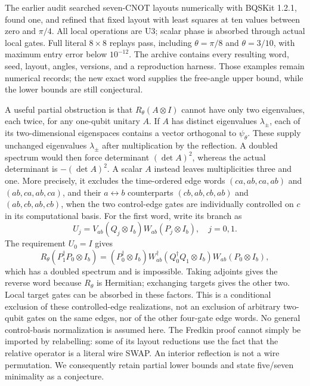 \documentclass[11pt]{article}
\begin{document}
The earlier audit searched seven-CNOT layouts numerically with BQSKit 1.2.1,
found one, and refined that fixed layout with least squares at ten values
between zero and $\pi/4$. All local operations are U3; scalar phase is
absorbed through actual local gates. Full literal $8\times8$ replays pass,
including $\theta=\pi/8$ and $\theta=3/10$, with maximum entry error below
$10^{-12}$. The archive contains every resulting word, seed, layout, angles,
versions, and a reproduction harness. Those examples remain numerical records; the new exact word supplies the
free-angle upper bound, while the lower bounds are still conjectural.

A useful partial obstruction is that $R_\theta(A\otimes I)$ cannot have
only two eigenvalues, each twice, for any one-qubit unitary $A$.
If $A$ has distinct eigenvalues $\lambda_\pm$, each of its two-dimensional
eigenspaces contains a vector orthogonal to $\psi_\theta$. These supply
unchanged eigenvalues $\lambda_\pm$ after multiplication by the reflection.
A doubled spectrum would then force determinant $(\det A)^2$, whereas the
actual determinant is $-(\det A)^2$. A scalar $A$ instead leaves multiplicities
three and one. More precisely, it excludes the time-ordered edge words
$(ca,ab,ca,ab)$ and $(ab,ca,ab,ca)$, and their $a\leftrightarrow b$
counterparts $(cb,ab,cb,ab)$ and $(ab,cb,ab,cb)$, when the two control-edge
gates are individually controlled on $c$ in its computational basis.
For the first word, write its branch as
\[
 U_j=V_{ab}(Q_j\otimes I_b)W_{ab}(P_j\otimes I_b),\quad j=0,1.
\]
The requirement $U_0=I$ gives
\[
 R_\theta(P_1^\dagger P_0\otimes I_b)
 = (P_0^\dagger\otimes I_b)W_{ab}^\dagger
   (Q_0^\dagger Q_1\otimes I_b)W_{ab}(P_0\otimes I_b),
\]
which has a doubled spectrum and is impossible. Taking adjoints gives the
reverse word because $R_\theta$ is Hermitian; exchanging targets gives the
other two. Local target gates can be absorbed in these factors. This is a
conditional exclusion of these controlled-edge realizations, not an exclusion
of arbitrary two-qubit gates on the same edges, nor of the other four-gate
edge words. No general control-basis normalization is assumed here.
The Fredkin proof cannot simply be imported by relabelling: some of its
layout reductions use the fact that the relative operator is a literal
wire SWAP. An interior reflection is not a wire permutation. We consequently
retain partial lower bounds and state five/seven minimality as a conjecture.
\end{document}
